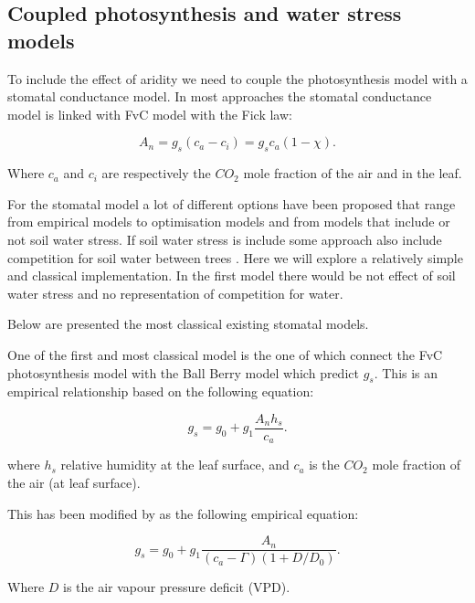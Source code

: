 \documentclass[a4paper,11pt]{article}
\begin{document}
\clearpage

\subsection{Coupled photosynthesis and water stress models}

To include the effect of aridity we need to couple the photosynthesis model with a stomatal conductance model. In most approaches the stomatal conductance model is linked with FvC model with the Fick law:

\begin{equation}
\label{eq:fick}
A_n = g_s (c_a - c_i) = g_s c_a (1-\chi).
\end{equation}

Where $c_a$ and $c_i$ are respectively the $CO_2$ mole fraction of the air and in the leaf.


For the stomatal model a lot of different options have been proposed that range from empirical models to optimisation models and from models that include or not soil water stress. If soil water stress is include some approach also include competition for soil water between trees \citep{Farrior-2013}. Here we will explore a relatively simple and classical implementation. In the first model there would be not effect of soil water stress and no representation of competition for water.

Below are presented the most classical existing stomatal models.

One of the first and most classical model is the one of \citet{Collatz-1991} which connect the FvC photosynthesis model with the Ball Berry model which predict $g_s$. This is an empirical relationship based on the following equation:

\begin{equation}
\label{eq:gs-Ball}
g_s= g_0 + g_1 \frac{A_n h_s}{c_a}.
\end{equation}

where $h_s$ relative humidity at the leaf surface, and $c_a$ is the $CO_2$ mole fraction of the air (at leaf surface).

This has been modified by \citet{Leuning-1995} as the following empirical equation:

\begin{equation}
\label{eq:gs-Leuning}
g_s= g_0 + g_1 \frac{A_n }{(c_a - \Gamma)(1+D/D_0)}.
\end{equation}

Where $D$ is the air vapour pressure deficit (VPD).
\end{document}
